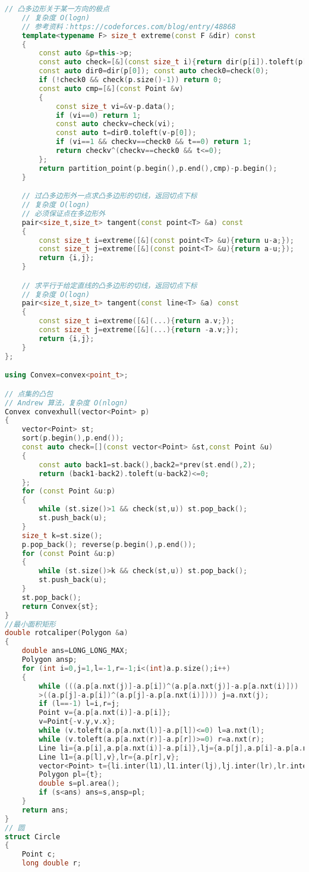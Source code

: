 \documentclass[a4paper]{book}
\begin{document}
\begin{lstlisting}[language=c++]
    // 凸多边形关于某一方向的极点
    // 复杂度 O(logn)
    // 参考资料：https://codeforces.com/blog/entry/48868
    template<typename F> size_t extreme(const F &dir) const
    {
        const auto &p=this->p;
        const auto check=[&](const size_t i){return dir(p[i]).toleft(p[this->nxt(i)]-p[i])>=0;};
        const auto dir0=dir(p[0]); const auto check0=check(0);
        if (!check0 && check(p.size()-1)) return 0;
        const auto cmp=[&](const Point &v)
        {
            const size_t vi=&v-p.data();
            if (vi==0) return 1;
            const auto checkv=check(vi);
            const auto t=dir0.toleft(v-p[0]);
            if (vi==1 && checkv==check0 && t==0) return 1;
            return checkv^(checkv==check0 && t<=0);
        };
        return partition_point(p.begin(),p.end(),cmp)-p.begin();
    }

    // 过凸多边形外一点求凸多边形的切线，返回切点下标
    // 复杂度 O(logn)
    // 必须保证点在多边形外
    pair<size_t,size_t> tangent(const point<T> &a) const
    {
        const size_t i=extreme([&](const point<T> &u){return u-a;});
        const size_t j=extreme([&](const point<T> &u){return a-u;});
        return {i,j};
    }

    // 求平行于给定直线的凸多边形的切线，返回切点下标
    // 复杂度 O(logn)
    pair<size_t,size_t> tangent(const line<T> &a) const
    {
        const size_t i=extreme([&](...){return a.v;});
        const size_t j=extreme([&](...){return -a.v;});
        return {i,j};
    }
};

using Convex=convex<point_t>;

// 点集的凸包
// Andrew 算法，复杂度 O(nlogn)
Convex convexhull(vector<Point> p)
{
    vector<Point> st;
    sort(p.begin(),p.end());
    const auto check=[](const vector<Point> &st,const Point &u)
    {
        const auto back1=st.back(),back2=*prev(st.end(),2);
        return (back1-back2).toleft(u-back2)<=0;
    };
    for (const Point &u:p)
    {
        while (st.size()>1 && check(st,u)) st.pop_back();
        st.push_back(u);
    }
    size_t k=st.size();
    p.pop_back(); reverse(p.begin(),p.end());
    for (const Point &u:p)
    {
        while (st.size()>k && check(st,u)) st.pop_back();
        st.push_back(u);
    }
    st.pop_back();
    return Convex{st};
}
//最小面积矩形 
double rotcaliper(Polygon &a)
{
    double ans=LONG_LONG_MAX;
    Polygon ansp;
    for (int i=0,j=1,l=-1,r=-1;i<(int)a.p.size();i++)
    {
        while (((a.p[a.nxt(j)]-a.p[i])^(a.p[a.nxt(j)]-a.p[a.nxt(i)]))
        >((a.p[j]-a.p[i])^(a.p[j]-a.p[a.nxt(i)]))) j=a.nxt(j);
        if (l==-1) l=i,r=j;
        Point v={a.p[a.nxt(i)]-a.p[i]};
        v=Point{-v.y,v.x};
        while (v.toleft(a.p[a.nxt(l)]-a.p[l])<=0) l=a.nxt(l);
        while (v.toleft(a.p[a.nxt(r)]-a.p[r])>=0) r=a.nxt(r);
        Line li={a.p[i],a.p[a.nxt(i)]-a.p[i]},lj={a.p[j],a.p[i]-a.p[a.nxt(i)]};
        Line l1={a.p[l],v},lr={a.p[r],v};
        vector<Point> t={li.inter(l1),l1.inter(lj),lj.inter(lr),lr.inter(li)};
        Polygon pl={t};
        double s=pl.area();
        if (s<ans) ans=s,ansp=pl;
    }
    return ans;
}
// 圆
struct Circle
{
    Point c;
    long double r;


\end{lstlisting}
\end{document}
